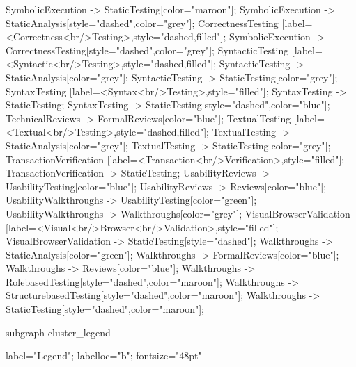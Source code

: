 \documentclass{article}
\begin{document}
{SymbolicExecution -> StaticTesting[color="maroon"];
SymbolicExecution -> StaticAnalysis[style="dashed",color="grey"];
CorrectnessTesting [label=<Correctness<br/>Testing>,style="dashed,filled"];
SymbolicExecution -> CorrectnessTesting[style="dashed",color="grey"];
SyntacticTesting [label=<Syntactic<br/>Testing>,style="dashed,filled"];
SyntacticTesting -> StaticAnalysis[color="grey"];
SyntacticTesting -> StaticTesting[color="grey"];
SyntaxTesting [label=<Syntax<br/>Testing>,style="filled"];
SyntaxTesting -> StaticTesting;
SyntaxTesting -> StaticTesting[style="dashed",color="blue"];
TechnicalReviews -> FormalReviews[color="blue"];
TextualTesting [label=<Textual<br/>Testing>,style="dashed,filled"];
TextualTesting -> StaticAnalysis[color="grey"];
TextualTesting -> StaticTesting[color="grey"];
TransactionVerification [label=<Transaction<br/>Verification>,style="filled"];
TransactionVerification -> StaticTesting;
UsabilityReviews -> UsabilityTesting[color="blue"];
UsabilityReviews -> Reviews[color="blue"];
UsabilityWalkthroughs -> UsabilityTesting[color="green"];
UsabilityWalkthroughs -> Walkthroughs[color="grey"];
VisualBrowserValidation [label=<Visual<br/>Browser<br/>Validation>,style="filled"];
VisualBrowserValidation -> StaticTesting[style="dashed"];
Walkthroughs -> StaticAnalysis[color="green"];
Walkthroughs -> FormalReviews[color="blue"];
Walkthroughs -> Reviews[color="blue"];
Walkthroughs -> RolebasedTesting[style="dashed",color="maroon"];
Walkthroughs -> StructurebasedTesting[style="dashed",color="maroon"];
Walkthroughs -> StaticTesting[style="dashed",color="maroon"];

subgraph cluster_legend {

    label="Legend";
    labelloc="b";
    fontsize="48pt"

}}
\end{document}
